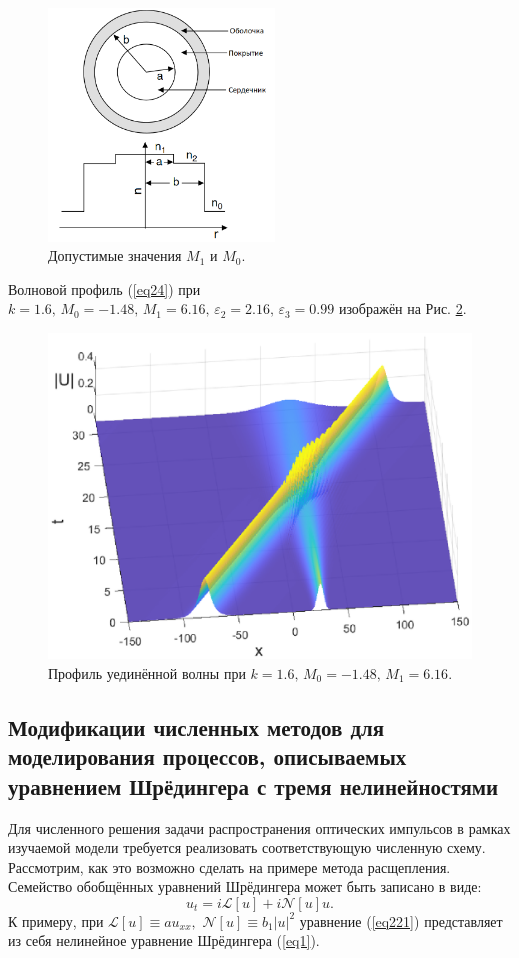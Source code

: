 \documentclass[14pt,a4paper]{extreport}
\begin{document}
			\begin{figure}[H]  %
				\center
				\includegraphics[width=6cm,trim={0 0 0 0},clip]{fig1.png} 
				\caption{Допустимые значения \(M_{1}\) и \(M_{0}.\)}
				\label{fig1}
			\end{figure}

			Волновой профиль (\ref{eq24}) при \(k=1.6,\, M_{0}=-1.48,\, M_{1}=6.16,\,\varepsilon_{2}=2.16,\,\varepsilon_{3}=0.99\) изображён на Рис. \ref{fig8}.
			\begin{figure}[H]
				\center
				\includegraphics[width=0.5\linewidth]{fig10.eps}
				\caption{Профиль уединённой волны при \(k=1.6,\, M_{0}=-1.48,\, M_{1}=6.16.\)}
				\label{fig8}
			\end{figure}
		\subsection{Модификации численных методов для моделирования процессов, описываемых уравнением Шрёдингера с тремя нелинейностями}\label{ch220}			
			Для численного решения задачи распространения оптических импульсов в рамках изучаемой модели требуется реализовать соответствующую численную схему. Рассмотрим, как это возможно сделать на примере метода расщепления.
			Семейство обобщённых уравнений Шрёдингера может быть записано в виде:
			\begin{equation}\label{eq221}
				u_{t}=i\mathscr{L} [u]+i\mathscr{N}[u]u.
			\end{equation}
			К примеру, при \(\mathscr{L} [u] \equiv a u_{xx},  \,\,  \mathscr{N} [u] \equiv b_{1} |u|^2\) уравнение (\ref{eq221}) представляет из себя нелинейное уравнение Шрёдингера (\ref{eq1}).
\end{document}
